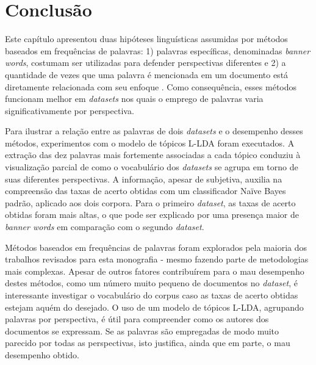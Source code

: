 \section{Conclusão}

Este capítulo apresentou duas hipóteses linguísticas assumidas por métodos baseados em frequências de palavras: 1) palavras específicas, denominadas \emph{banner words}, costumam ser utilizadas para defender perspectivas diferentes e 2) a quantidade de vezes que uma palavra é mencionada em um documento está diretamente relacionada com seu enfoque \cite{teubert2001}. Como consequência, esses métodos funcionam melhor em \emph{datasets} nos quais o emprego de palavras varia significativamente por perspectiva. %


Para ilustrar a relação entre as palavras de dois \emph{datasets} e o desempenho desses métodos, experimentos com o modelo de tópicos L-LDA foram executados. A extração das dez palavras mais fortemente associadas a cada tópico conduziu à visualização parcial de como o vocabulário dos \emph{datasets} se agrupa em torno de suas diferentes perspectivas. A informação, apesar de subjetiva, auxilia na compreensão das taxas de acerto obtidas com um classificador Naïve Bayes padrão, aplicado aos dois corpora. Para o primeiro \emph{dataset}, as taxas de acerto obtidas foram mais altas, o que pode ser explicado por uma presença maior de \emph{banner words} em comparação com o segundo \emph{dataset}.

Métodos baseados em frequências de palavras foram explorados pela maioria dos trabalhos revisados para esta monografia - mesmo fazendo parte de metodologias mais complexas. Apesar de outros fatores contribuírem para o mau desempenho destes métodos, como um número muito pequeno de documentos no \emph{dataset}, é interessante investigar o vocabulário do corpus caso as taxas de acerto obtidas estejam aquém do desejado. O uso de um modelo de tópicos L-LDA, agrupando palavras por perspectiva, é útil para compreender como os autores dos documentos se expressam. Se as palavras são empregadas de modo muito parecido por todas as perspectivas, isto justifica, ainda que em parte, o mau desempenho obtido.

